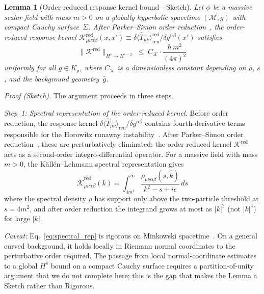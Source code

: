\documentclass[12pt,a4paper]{article}
\newtheorem{lemma}{Lemma}
\begin{document}
\begin{lemma}[Order-reduced response kernel bound---Sketch]
\label{lem:kernel_bound}
Let $\phi$ be a massive scalar field with mass $m > 0$ on a globally hyperbolic spacetime
$(\mathcal{M},\bar{g})$ with compact Cauchy surface~$\Sigma$. After Parker--Simon order
reduction~\emph{\cite{parker_simon}}, the order-reduced response kernel
$\mathcal{K}^{\mathrm{red}}_{\mu\nu\alpha\beta}(x,x')
\equiv \delta\langle\hat{T}_{\mu\nu}\rangle^{\mathrm{red}}_{\mathrm{ren}}/\delta g^{\alpha\beta}(x')$
satisfies
\begin{equation}
\bigl\|\mathcal{K}^{\mathrm{red}}\bigr\|_{H^s \to H^{s-2}}
\;\leq\; C_{\mathcal{K}} \cdot \frac{\hbar\, m^2}{(4\pi)^2}
\label{eq:kernel_bound}
\end{equation}
uniformly for all $g \in K_\rho$, where $C_{\mathcal{K}}$ is a dimensionless constant
depending on $\rho$, $s$, and the background geometry~$\bar{g}$.
\end{lemma}

\noindent\emph{Proof (Sketch).} The argument proceeds in three steps.

\smallskip\noindent\textit{Step~1: Spectral representation of the order-reduced kernel.}
Before order reduction, the response kernel
$\delta\langle\hat{T}_{\mu\nu}\rangle_{\mathrm{ren}}/\delta g^{\alpha\beta}$
contains fourth-derivative terms responsible for the Horowitz
runaway instability~\cite{horowitz}. After Parker--Simon order
reduction~\cite{parker_simon}, these are perturbatively eliminated: the
order-reduced kernel $\mathcal{K}^{\mathrm{red}}$ acts as a second-order
integro-differential operator. For a massive field with mass $m > 0$,
the K\"all\'en--Lehmann spectral representation gives
\begin{equation}
\tilde{\mathcal{K}}^{\mathrm{red}}_{\mu\nu\alpha\beta}(k)
= \int_{4m^2}^{\infty} \frac{\rho_{\mu\nu\alpha\beta}(s,\hat{k})}{k^2 - s + i\epsilon}\,ds
\label{eq:spectral_rep}
\end{equation}
where the spectral density $\rho$ has support only above the two-particle threshold at
$s = 4m^2$, and after order reduction the integrand grows at most as $|k|^2$
(not $|k|^4$) for large $|k|$.

\textit{Caveat:} Eq.~\eqref{eq:spectral_rep} is rigorous on Minkowski
spacetime~\cite{horowitz,phillips_hu,hu_verdaguer}. On a general curved background, it holds locally
in Riemann normal coordinates to the perturbative order required. The passage from local
normal-coordinate estimates to a global $H^s$ bound on a compact Cauchy surface requires a
partition-of-unity argument that we do not complete here; this is the gap that makes the
Lemma a Sketch rather than Rigorous.
\end{document}
